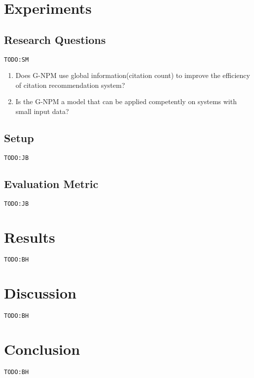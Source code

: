 \documentclass{llncs}
\newcommand{\todo}[1]{\texttt{\color{red}TODO:#1}}
\begin{document}
\section{Experiments}
\subsection{Research Questions}
\todo{SM}

\begin{enumerate}
\item Does G-NPM use global information(citation count) to improve the efficiency of citation recommendation system?
\item Is the G-NPM a model that can be applied competently on systems with small input data?
\end{enumerate}
\subsection{Setup}
\todo{JB}

\subsection{Evaluation Metric}
\todo{JB}

\section{Results}
\todo{BH}

\section{Discussion}
\todo{BH}

\section{Conclusion}
\label{sec:Conclusion}
\todo{BH}




\end{document}
